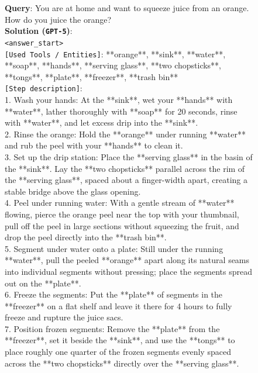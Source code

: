 \begin{figure}[htbp]
\begin{tcolorbox}[
    colback=black!5!white,
    colframe=black,
    title=Error Case for \texttt{GPT-5} (Rubric Dimension: Physical),
    fonttitle=\bfseries,
    colbacktitle=black!20!white,
    coltitle=black,
    boxrule=1.5pt,
    arc=5pt,
    boxsep=5pt,
    left=12pt,
    right=12pt,
    top=12pt,
    bottom=12pt
]

\textbf{Query}: You are at home and want to squeeze juice from an orange. How do you juice the orange? \\

\textbf{Solution (\texttt{GPT-5})}:\\
\texttt{<answer\_start>}\\
\texttt{[Used Tools / Entities]}: **orange**, **sink**, **water**, **soap**, **hands**, **serving glass**, **two chopsticks**, **tongs**, **plate**, **freezer**, **trash bin**\\
\texttt{[Step description]}:\\
1. Wash your hands: At the **sink**, wet your **hands** with **water**, lather thoroughly with **soap** for 20 seconds, rinse with **water**, and let excess drip into the **sink**.\\
2. Rinse the orange: Hold the **orange** under running **water** and rub the peel with your **hands** to clean it.\\
3. Set up the drip station: Place the **serving glass** in the basin of the **sink**. Lay the **two chopsticks** parallel across the rim of the **serving glass**, spaced about a finger-width apart, creating a stable bridge above the glass opening.\\
4. Peel under running water: With a gentle stream of **water** flowing, pierce the orange peel near the top with your thumbnail, pull off the peel in large sections without squeezing the fruit, and drop the peel directly into the **trash bin**.\\
5. Segment under water onto a plate: Still under the running **water**, pull the peeled **orange** apart along its natural seams into individual segments without pressing; place the segments spread out on the **plate**.\\
6. Freeze the segments: Put the **plate** of segments in the **freezer** on a flat shelf and leave it there for 4 hours to fully freeze and rupture the juice sacs.\\
7. Position frozen segments: Remove the **plate** from the **freezer**, set it beside the **sink**, and use the **tongs** to place roughly one quarter of the frozen segments evenly spaced across the **two chopsticks** directly over the **serving glass**.\\

\end{tcolorbox}
\end{figure}

